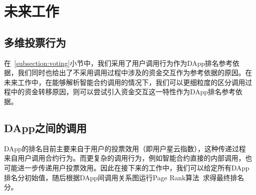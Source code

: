 \section{未来工作}
\subsection{多维投票行为}
在~\ref{subsection:voting}小节中，我们采用了用户调用行为作为DApp排名参考依据，我们同时也给出了不采用调用过程中涉及的资金交互作为参考依据的原因。在未来工作中，在能够解析智能合约调用的情况下，我们可以更细粒度的区分调用过程中的资金转移原因，则可以尝试引入资金交互这一特性作为DApp排名参考依据。

\subsection{DApp之间的调用}
DApp的排名目前主要来自于用户的投票效用（即用户星云指数），这种传递过程来自用户调用合约行为。而更复杂的调用行为，例如智能合约直接的内部调用，也可能进一步传递用户投票效用。因此在接下来的工作中，我们可以给定所有DApp排名分初始值，随后根据DApp间调用关系图运行Page Rank算法~\cite{page1999pagerank}求得最终排名分。

